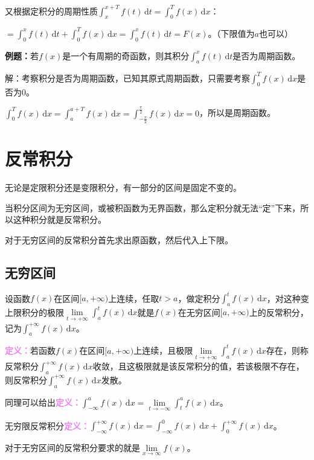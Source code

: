 \documentclass[UTF8, 12pt]{ctexart}
\begin{document}
又根据定积分的周期性质$\int_x^{x+T}f(t)\,\textrm{d}t=\int_0^Tf(x)\,\textrm{d}x$：

$=\int_0^xf(t)\,\textrm{d}t+\int_0^Tf(x)\,\textrm{d}x=\int_0^xf(t)\,\textrm{d}t=F(x)$。（下限值为$a$也可以）

\textbf{例题：}若$f(x)$是一个有周期的奇函数，则其积分$\int_a^xf(t)\,\textrm{d}t$是否为周期函数。

解：考察积分是否为周期函数，已知其原式周期函数，只需要考察$\int_0^Tf(x)\,\textrm{d}x$是否为0。

$\int_0^Tf(x)\,\textrm{d}x=\int_a^{a+T}f(x)\,\textrm{d}x=\int_{-\frac{\pi}{2}}^{\frac{\pi}{2}}f(x)\,\textrm{d}x=0$，所以是周期函数。

\section{反常积分}

无论是定限积分还是变限积分，有一部分的区间是固定不变的。

当积分区间为无穷区间，或被积函数为无界函数，那么定积分就无法“定”下来，所以这种积分就是反常积分。

对于无穷区间的反常积分首先求出原函数，然后代入上下限。

\subsection{无穷区间}

设函数$f(x)$在区间$[a,+\infty)$上连续，任取$t>a$，做定积分$\int_a^tf(x)\,\textrm{d}x$，对这种变上限积分的极限$\lim\limits_{t\to+\infty}\int_a^tf(x)\,\textrm{d}x$就是$f(x)$在无穷区间$[a,+\infty)$上的反常积分，记为$\int_a^{+\infty}f(x)\,\textrm{d}x$。

\textcolor{violet}{\textbf{定义：}}若函数$f(x)$在区间$[a,+\infty)$上连续，且极限$\lim\limits_{t\to+\infty}\int_a^tf(x)\,\textrm{d}x$存在，则称反常积分$\int_a^{+\infty}f(x)\,\textrm{d}x$收敛，且这极限就是该反常积分的值，若该极限不存在，则反常积分$\int_a^{+\infty}f(x)\,\textrm{d}x$发散。

同理可以给出\textcolor{violet}{\textbf{定义：}}$\int_{-\infty}^af(x)\,\textrm{d}x=\lim\limits_{t\to-\infty}\int_t^af(x)\,\textrm{d}x$。

无穷限反常积分\textcolor{violet}{\textbf{定义：}}$\int_{-\infty}^{+\infty}f(x)\,\textrm{d}x=\int_{-\infty}^0f(x)\,\textrm{d}x+\int_0^{+\infty}f(x)\,\textrm{d}x$。

对于无穷区间的反常积分要求的就是$\lim\limits_{x\to\infty}f(x)$。
\end{document}
